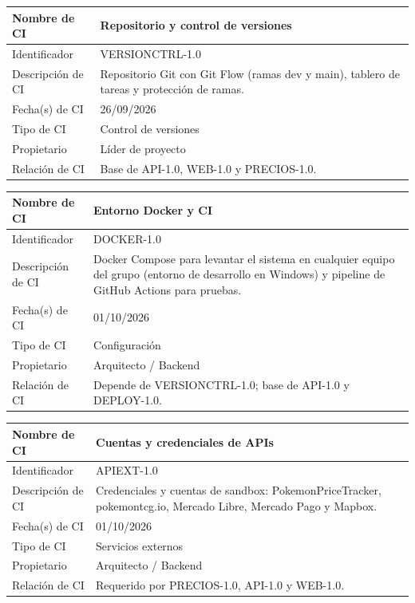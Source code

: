 \documentclass[letterpaper,11pt]{article}
\begin{document}
\noindent\begin{minipage}{\textwidth}
\small\renewcommand{\arraystretch}{1.9}
\begin{tabularx}{\textwidth}{|p{3.3cm}|Y|}
\hline
Nombre de CI & Repositorio y control de versiones \\ \hline
Identificador & VERSIONCTRL-1.0 \\ \hline
Descripción de CI & Repositorio Git con Git Flow (ramas dev y main), tablero de tareas y protección de ramas. \\ \hline
Fecha(s) de CI & 26/09/2026 \\ \hline
Tipo de CI & Control de versiones \\ \hline
Propietario & Líder de proyecto \\ \hline
Relación de CI & Base de API-1.0, WEB-1.0 y PRECIOS-1.0. \\ \hline
\end{tabularx}
\end{minipage}\par\bigskip
\noindent\begin{minipage}{\textwidth}
\small\renewcommand{\arraystretch}{1.9}
\begin{tabularx}{\textwidth}{|p{3.3cm}|Y|}
\hline
Nombre de CI & Entorno Docker y CI \\ \hline
Identificador & DOCKER-1.0 \\ \hline
Descripción de CI & Docker Compose para levantar el sistema en cualquier equipo del grupo (entorno de desarrollo en Windows) y pipeline de GitHub Actions para pruebas. \\ \hline
Fecha(s) de CI & 01/10/2026 \\ \hline
Tipo de CI & Configuración \\ \hline
Propietario & Arquitecto / Backend \\ \hline
Relación de CI & Depende de VERSIONCTRL-1.0; base de API-1.0 y DEPLOY-1.0. \\ \hline
\end{tabularx}
\end{minipage}\par\bigskip
\noindent\begin{minipage}{\textwidth}
\small\renewcommand{\arraystretch}{1.9}
\begin{tabularx}{\textwidth}{|p{3.3cm}|Y|}
\hline
Nombre de CI & Cuentas y credenciales de APIs \\ \hline
Identificador & APIEXT-1.0 \\ \hline
Descripción de CI & Credenciales y cuentas de sandbox: PokemonPriceTracker, pokemontcg.io, Mercado Libre, Mercado Pago y Mapbox. \\ \hline
Fecha(s) de CI & 01/10/2026 \\ \hline
Tipo de CI & Servicios externos \\ \hline
Propietario & Arquitecto / Backend \\ \hline
Relación de CI & Requerido por PRECIOS-1.0, API-1.0 y WEB-1.0. \\ \hline
\end{tabularx}
\end{minipage}\par\bigskip
\end{document}
